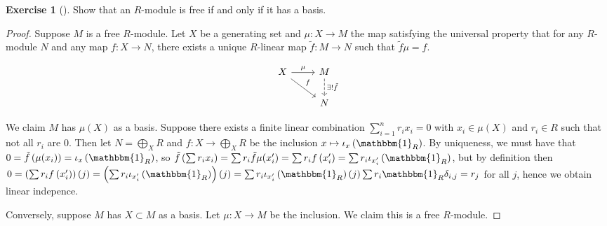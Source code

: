 \documentclass[reqno]{amsart}
\theoremstyle{definition}
\newtheorem{exercise}[theorem]{Exercise}
\theoremstyle{remark}
\begin{document}
        \begin{exercise}[]
            Show that an $R$-module is free if and only if
            it has a basis.
        \end{exercise}

        \begin{proof}
            Suppose $M$ is a free $R$-module.
            Let $X$ be a generating set
            and $\mu \colon X \to M$ the map satisfying the
            universal property that for
            any $R$-module $N$ and any map
            $f \colon X \to N$, there exists a unique
            $R$-linear map $\tilde{f} \colon M \to N$ 
            such that
            $\tilde{f}\mu = f$.

            \begin{equation*}
            \begin{tikzcd}
                X \ar[r, "\mu"] \ar[dr, "f"] & M \ar[d, "\exists!
                \tilde{f}",
                dashed]\\
                                             & N
            \end{tikzcd}
            \end{equation*}

            We claim $M$ has $\mu (X)$ as a basis.
            Suppose there exists
            a finite linear combination
            $\sum_{i=1}^{n} r_i x_i = 0$ with
            $x_i \in \mu(X)$ and $r_i \in R$ such that
            not all $r_i$ are $0$.
            Then let $N = \bigoplus_{X} R$ and
            $f \colon X \to \bigoplus_X R$ be the
            inclusion
            $x \mapsto \iota_x \left( \mathbbm{1}_R \right) $.
            By uniqueness, we must have
            that 
            $0 = \tilde{f}\left( \mu (x_i) \right) 
            = \iota_x \left( \mathbbm{1}_R \right) $, so
            $\tilde{f}\left( \sum r_i x_i \right) 
            = \sum r_i \tilde{f} \mu (x_i')
            = \sum r_i f\left( x_i' \right)
            = \sum r_i \iota_{x_i'}\left( \mathbbm{1}_R \right) $,
            but by
            definition then 
            $0 = \left( \sum r_i f\left( x_i' \right)  \right) (j)
            = \left( \sum r_i \iota_{x_i'} \left( \mathbbm{1}_R \right) 
            \right) (j) =
            \sum r_i \iota_{x_i'}\left( \mathbbm{1}_R \right) (j)
            \sum r_i \mathbbm{1}_R \delta_{i,j}
            = r_j
            $ for all $j$, hence
            we obtain linear indepence.

            Conversely, suppose
            $M$ has $X \subset M$ as a basis.
            Let $\mu \colon X \to M$ be the inclusion.
            We claim this is a free $R$-module.


\end{proof}
\end{document}
